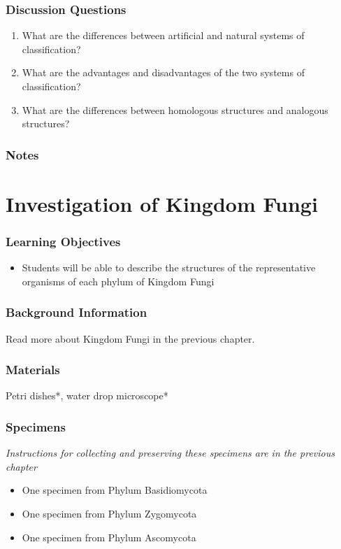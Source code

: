 \subsubsection*{Discussion Questions}
\begin{enumerate}
\item{What are the differences between artificial and natural systems of classification?}
\item{What are the advantages and disadvantages of the two systems of classification?}
\item{What are the differences between homologous structures and analogous structures?}
\end{enumerate}

\subsubsection*{Notes}

\section{Investigation of Kingdom Fungi}

\subsubsection*{Learning Objectives}
\begin{itemize}
\item{Students will be able to describe the structures of the representative organisms of each phylum of Kingdom Fungi}
\end{itemize}

\subsubsection*{Background Information}
Read more about Kingdom Fungi in the previous chapter.

\subsubsection*{Materials}
Petri dishes*, water drop microscope*

\subsubsection*{Specimens}
\textit{Instructions for collecting and preserving these specimens are in the previous chapter}
\begin{itemize}
\item{One specimen from Phylum Basidiomycota}
\item{One specimen from Phylum Zygomycota}
\item{One specimen from Phylum Ascomycota}
\end{itemize}


